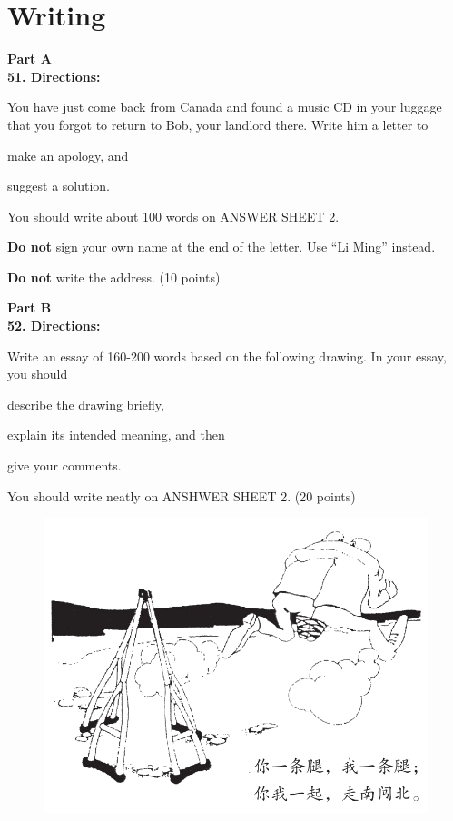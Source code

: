 \newpage

\section{Writing}


\noindent
\textbf{Part A}\\
\textbf{51. Directions:}

You have just come back from Canada and found a music CD
in your luggage that you forgot to return to Bob, your landlord there.
Write him a letter to
\begin{listwrite}
	\item
 make an apology, and

\item 
suggest a solution.
\end{listwrite}

You should write about 100 words on ANSWER SHEET 2.

\textbf{Do not} sign your own name at the end of the letter. Use ``Li
Ming'' instead.

\textbf{Do not} write the address. (10 points)

\vspace{2em}


\noindent
\textbf{Part B}\\
\textbf{52. Directions:}

Write an essay of 160-200 words based on the following drawing. In your
essay, you should
\begin{listwrite}
	\item
 describe the drawing briefly,

\item 
explain its intended meaning, and then

\item 
give your comments.
\end{listwrite}

You should write neatly on ANSHWER SHEET 2. (20 points)



\begin{figure}[h!]
	\centering
	\includegraphics[width=0.54\linewidth]{picture/2008.png}
\end{figure}

